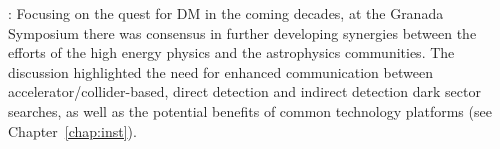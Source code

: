 






: Focusing on the quest for DM in the coming decades, at the Granada Symposium
there was consensus in further developing synergies between the efforts of the high energy physics and the astrophysics communities. 
The discussion highlighted the need for enhanced communication between accelerator/collider-based, direct detection and indirect detection dark sector searches, as well as the potential benefits of common technology platforms (see Chapter~\ref{chap:inst}). 

